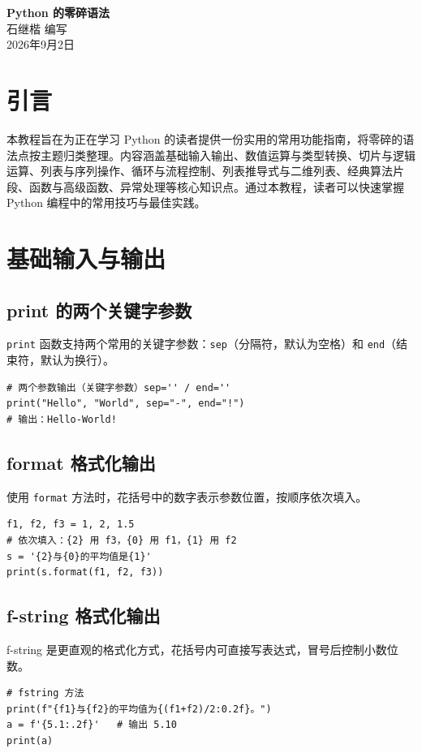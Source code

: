 \documentclass{article}
\begin{document}
\begin{center}
	{\LARGE \textbf{Python 的零碎语法}} \\[0.5cm]
	{\large {\kaishu 石继楷 \quad 编写}} \\[0.3cm]
	{\normalsize 2026年9月2日}
\end{center}
\tableofcontents
\newpage
\section{引言}
本教程旨在为正在学习 Python 的读者提供一份实用的常用功能指南，将零碎的语法点按主题归类整理。内容涵盖基础输入输出、数值运算与类型转换、切片与逻辑运算、列表与序列操作、循环与流程控制、列表推导式与二维列表、经典算法片段、函数与高级函数、异常处理等核心知识点。通过本教程，读者可以快速掌握 Python 编程中的常用技巧与最佳实践。

\section{基础输入与输出}
\subsection{print 的两个关键字参数}
\texttt{print} 函数支持两个常用的关键字参数：\texttt{sep}（分隔符，默认为空格）和 \texttt{end}（结束符，默认为换行）。
\begin{lstlisting}
# 两个参数输出（关键字参数）sep='' / end=''
print("Hello", "World", sep="-", end="!")
# 输出：Hello-World!
\end{lstlisting}

\subsection{format 格式化输出}
使用 \texttt{format} 方法时，花括号中的数字表示参数位置，按顺序依次填入。
\begin{lstlisting}
f1, f2, f3 = 1, 2, 1.5
# 依次填入：{2} 用 f3，{0} 用 f1，{1} 用 f2
s = '{2}与{0}的平均值是{1}'
print(s.format(f1, f2, f3))
\end{lstlisting}

\subsection{f-string 格式化输出}
f-string 是更直观的格式化方式，花括号内可直接写表达式，冒号后控制小数位数。
\begin{lstlisting}
# fstring 方法
print(f"{f1}与{f2}的平均值为{(f1+f2)/2:0.2f}。")
a = f'{5.1:.2f}'   # 输出 5.10
print(a)
\end{lstlisting}
\end{document}
